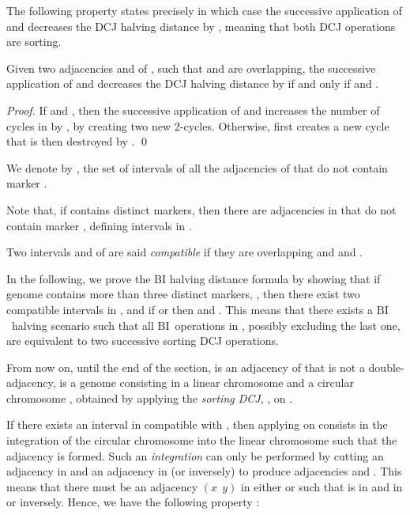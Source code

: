 \documentclass{llncs}
\newcommand{\fst}[1]{ \ensuremath{#1} }
\newcommand\aff[2]{\ensuremath{(\fst{#1}~~\fst{#2})}}
\def\BI{\ensuremath{\mbox{BI}}}
\begin{document}
The following property states precisely in which case the successive application of  and  decreases the DCJ halving distance by , meaning that both DCJ operations are sorting.

\begin{property}
Given two adjacencies  and  of , such that 
 and  are overlapping, the successive application of  and  decreases the DCJ halving distance by  if and only if   and .
\end{property}
\begin{proof}
If  and , then the successive application of  and  increases the number of cycles in  by , by creating two new 2-cycles. Otherwise,  first creates a new cycle that is then destroyed by  .
\qed
\end{proof}

We denote by , the set of intervals of all the adjacencies of  that do not contain marker .

\begin{remark}
Note that, if  contains  distinct markers, then there are  adjacencies in  that do not contain marker ,  defining  intervals in  .
\label{maxEdges}
\end{remark}

\begin{definition}
Two  intervals  and  of  are said \emph{compatible} if they are overlapping and   and .
\end{definition}



In the following, we prove the BI halving distance formula by showing that if genome  contains more than three distinct markers, ,  then there exist two compatible intervals in , and if  or  then  and .
This means that there exists a \BI ~halving scenario  such that all \BI ~operations in , possibly excluding the last one, are equivalent to two successive sorting DCJ operations.






From now on, until the end of the section,
 is an adjacency of  that is not a double-adjacency,  is a genome consisting in a linear chromosome  and a circular chromosome , obtained by applying the \emph{sorting DCJ}, , on .

If there exists an interval  in  compatible with  , then applying  on  consists in the integration of the circular chromosome  into the linear chromosome  such that the adjacency  is formed.
Such an \emph{integration} can only be performed by cutting an adjacency  in  and an adjacency  in  (or inversely) to produce adjacencies  and .  This means that there must be an adjacency \aff{x}{y} in either  or  such that  is in  and  in  or inversely.
Hence, we have the following property :
\end{document}
